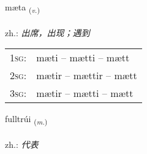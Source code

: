 \documentclass[frontgrid, backgrid]{flacards}\usepackage[]{graphicx}\usepackage[]{xcolor}
\begin{document}
\renewcommand{\flhead}{\vskip5pt \fboxsep=0pt {\small\bfseries\footnotesize Sagnorð | 动词}}
\renewcommand{\fcfoot}{\vskip5pt \fboxsep=0pt \hspace{2pt}{\small\bfseries\footnotesize 1K}}

\renewcommand{\blhead}{\vskip5pt {\small\bfseries\footnotesize Sagnorð | 动词 }}
\renewcommand{\bcfoot}{\vskip5pt \hspace{2pt}{\small\bfseries\footnotesize 1K}}


{mæta \small{\textsubscript{(\textit{v.})}} \\[1ex] %
\textphonetic{[maiːta]} \\
zh.: \emph{出席，出现；遇到} \\  [2ex]
\renewcommand*{\arraystretch}{0.8}
\begin{tabular}{p{1cm}l}
\textsc{1sg}: & mæti -- mætti -- mætt \\ 
\textsc{2sg}: & mætir -- mættir -- mætt \\ 
\textsc{3sg}: & mætir -- mætti -- mætt \\ 
\end{tabular}
}

\renewcommand{\flhead}{\vskip5pt \fboxsep=0pt {\small\bfseries\footnotesize Nafnorð | 名词}}
\renewcommand{\fcfoot}{\vskip5pt \fboxsep=0pt \hspace{2pt}{\small\bfseries\footnotesize 1K}}

\renewcommand{\blhead}{\vskip5pt {\small\bfseries\footnotesize Nafnorð | 名词 }}
\renewcommand{\bcfoot}{\vskip5pt \hspace{2pt}{\small\bfseries\footnotesize 1K}}


{fulltrúi \small{\textsubscript{(\textit{m.})}} \\[1ex] %
 \\
zh.: \emph{代表} \\  [2ex]
\renewcommand*{\arraystretch}{0.8}
}
\end{document}

